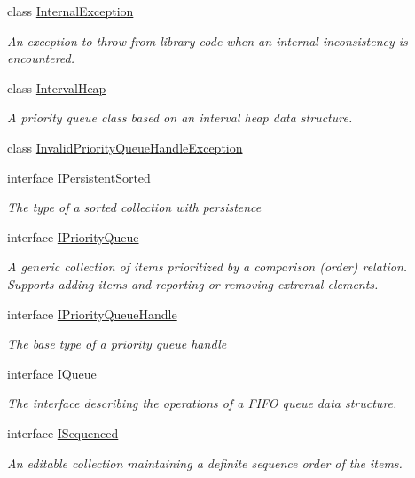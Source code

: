 \begin{DoxyCompactItemize}
class \hyperlink{class_c5_1_1_internal_exception}{Internal\+Exception}
\begin{DoxyCompactList}\small\item\em An exception to throw from library code when an internal inconsistency is encountered. \end{DoxyCompactList}\item 
class \hyperlink{class_c5_1_1_interval_heap}{Interval\+Heap}
\begin{DoxyCompactList}\small\item\em A priority queue class based on an interval heap data structure. \end{DoxyCompactList}\item 
class \hyperlink{class_c5_1_1_invalid_priority_queue_handle_exception}{Invalid\+Priority\+Queue\+Handle\+Exception}
\item 
interface \hyperlink{interface_c5_1_1_i_persistent_sorted}{I\+Persistent\+Sorted}
\begin{DoxyCompactList}\small\item\em The type of a sorted collection with persistence \end{DoxyCompactList}\item 
interface \hyperlink{interface_c5_1_1_i_priority_queue}{I\+Priority\+Queue}
\begin{DoxyCompactList}\small\item\em A generic collection of items prioritized by a comparison (order) relation. Supports adding items and reporting or removing extremal elements. \end{DoxyCompactList}\item 
interface \hyperlink{interface_c5_1_1_i_priority_queue_handle}{I\+Priority\+Queue\+Handle}
\begin{DoxyCompactList}\small\item\em The base type of a priority queue handle \end{DoxyCompactList}\item 
interface \hyperlink{interface_c5_1_1_i_queue}{I\+Queue}
\begin{DoxyCompactList}\small\item\em The interface describing the operations of a F\+I\+F\+O queue data structure. \end{DoxyCompactList}\item 
interface \hyperlink{interface_c5_1_1_i_sequenced}{I\+Sequenced}
\begin{DoxyCompactList}\small\item\em An editable collection maintaining a definite sequence order of the items. \end{DoxyCompactList}\item 

\end{DoxyCompactItemize}
